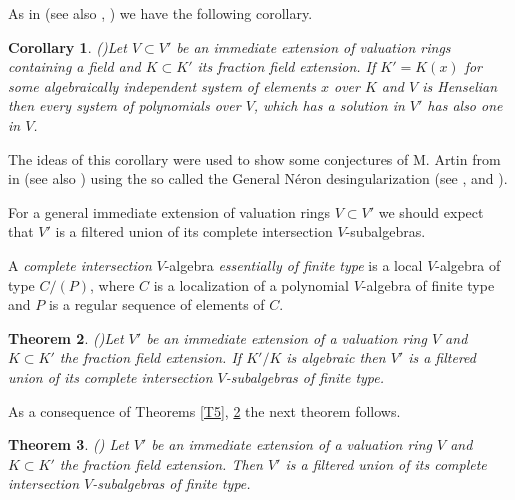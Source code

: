 \documentclass[12pt]{amsart}
\newtheorem{Theorem}{Theorem}[]
\newtheorem{Corollary}[Theorem]{Corollary}
\theoremstyle{definition}
\theoremstyle{subsection-tweak}
\theoremstyle{theorem}
\theoremstyle{definition}
\begin{document}
   

As in \cite[Proposition 18]{P1}(see also \cite[Corollary 24]{P3}, \cite[Proposition 1]{P4}) we have the following corollary.

\begin{Corollary}(\cite{P4})\label{C} Let $V\subset V'$ be an immediate extension of valuation rings containing a field and $K\subset K'$ its fraction field extension. If $K'=K(x)$ for some algebraically independent system of elements $x$ over $K$ 
and $V$ is Henselian then every system of polynomials over $V$, which has a solution in $V' $ has also one in $V$.
\end{Corollary}

The ideas of this corollary were used to show some conjectures of M. Artin from \cite{Ar} in 
\cite[Theorems 1.3, 1.4]{Po0} (see also \cite[Theorem 5.3.1]{I}) using the so called the General N\'eron desingularization (see  \cite[Theorem 2.5]{Po0}, \cite[Theorem 1.1]{S} and \cite[Theorem 5.2.56]{I}).


 


 





For a general immediate extension of valuation rings $V\subset V'$ we should expect that $V'$ is a  filtered  union of its complete intersection $V$-subalgebras. 
 
A {\em complete intersection} $V$-algebra {\it{essentially of finite type}} is a local $V$-algebra of type $C/(P)$, where $C$ is a localization of a polynomial $V$-algebra of finite type and $P$ is a regular sequence of elements of $C$. 

\begin{Theorem}  (\cite[Theorem 1]{P2})\label{T6} Let  $ V'$ be an  immediate extension  of a valuation ring $V$  and  $K\subset K'$ the fraction field extension. If $K'/K$ is algebraic  then $V'$ is a filtered
 union of its complete intersection $V$-subalgebras of finite type.
\end{Theorem}

As a consequence of Theorems \ref{T5}, \ref{T6} the next theorem follows.


\begin{Theorem} (\cite[Theorem 6]{P3}) \label{T7} Let  $ V'$ be an  immediate extension  of a valuation ring $V$  and  $K\subset K'$ the fraction field extension. Then $V'$ is a filtered
 union of its complete intersection $V$-subalgebras of finite type.
\end{Theorem}
\end{document}
